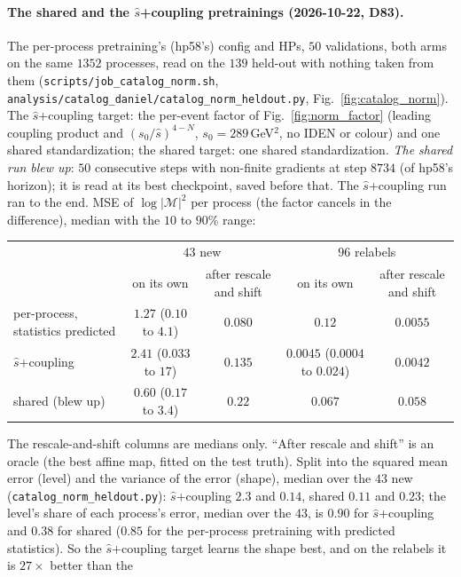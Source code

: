 \documentclass[11pt]{article}
\newcommand{\code}[1]{\texttt{#1}}
\begin{document}
\paragraph{The shared and the $\hat s$+coupling pretrainings (2026-10-22, D83).} The per-process pretraining's
(hp58's) config and HPs, $50$ validations, both arms on the
same $1352$ processes, read on the $139$ held-out with nothing taken from them (\code{scripts/job\_catalog\_norm.sh},
\code{analysis/catalog\_daniel/catalog\_norm\_heldout.py}, Fig.~\ref{fig:catalog_norm}). The $\hat s$+coupling target: the per-event factor of
Fig.~\ref{fig:norm_factor} (leading coupling product and $(s_0/\hat s)^{4-N}$, $s_0=289$\,GeV$^2$, no IDEN or colour)
and one shared standardization; the shared target: one shared standardization. \emph{The shared run blew up}: $50$ consecutive steps with
non-finite gradients at step $8734$ (of hp58's horizon); it is read at its best checkpoint, saved before that. The $\hat s$+coupling run ran
to the end. MSE of $\log|\mathcal M|^2$ per process (the factor cancels in the difference), median with the
$10$ to $90\%$ range:
\begin{center}
\begin{tabular}{lcccc}
 & \multicolumn{2}{c}{$43$ new} & \multicolumn{2}{c}{$96$ relabels} \\
 & on its own & after rescale and shift & on its own & after rescale and shift \\ \hline
per-process, statistics predicted & $1.27$ ($0.10$ to $4.1$) & $0.080$ & $0.12$ & $0.0055$ \\
$\hat s$+coupling & $2.41$ ($0.033$ to $17$) & $0.135$ & $0.0045$ ($0.0004$ to $0.024$) & $0.0042$ \\
shared (blew up) & $0.60$ ($0.17$ to $3.4$) & $0.22$ & $0.067$ & $0.058$ \\
\end{tabular}
\end{center}
The rescale-and-shift columns are medians only. ``After rescale and shift'' is an oracle (the best affine map, fitted on the test truth). Split into the squared mean
error (level) and the variance of the error (shape), median over the $43$ new (\code{catalog\_norm\_heldout.py}):
$\hat s$+coupling $2.3$ and $0.14$, shared $0.11$ and $0.23$; the level's share of each process's error, median over
the $43$, is $0.90$ for $\hat s$+coupling and $0.38$ for shared ($0.85$ for the per-process pretraining with predicted
statistics). So the $\hat s$+coupling target learns the shape best, and on the relabels it is $27\times$ better than the
\end{document}
